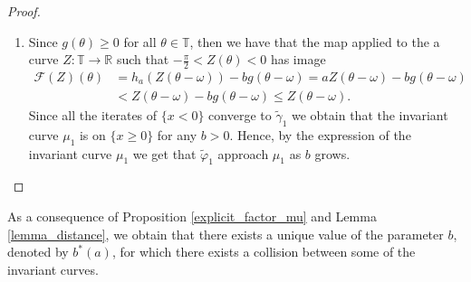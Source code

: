 \documentclass[12pt]{article}
\newcommand{\T}{\mathbb{T}}
\newcommand{\R}{\mathbb{R}}
\theoremstyle{plain}
\theoremstyle{remark}
\theoremstyle{definition}
\begin{document}
\begin{proof}
\begin{enumerate}
        \item Since $g(\theta)\geq0$ for all $\theta\in\T$, then we have that the map applied to the a curve $Z\colon\T\to\R$ such that $-\frac{\pi}{2}<Z(\theta)<0$ has image
            \begin{align*}
                \mathcal{F}(Z)(\theta) &= h_{a}(Z(\theta-\omega)) - b g(\theta-\omega) = a Z(\theta-\omega) - b g(\theta-\omega)\\
                &< Z(\theta-\omega) - b g(\theta-\omega) \leq Z(\theta-\omega).
            \end{align*}
        Since all the iterates of $\{x<0\}$ converge to $\tilde\gamma_1$ we obtain that the invariant curve $\mu_1$ is on $\{x\geq0\}$ for any $b>0$. Hence, by the expression of the invariant curve $\mu_1$ we get that $\tilde\varphi_1$ approach $\mu_1$ as $b$ grows.
    \end{enumerate}
\end{proof}

As a consequence of Proposition \eqref{explicit_factor_mu} and Lemma \eqref{lemma_distance}, we obtain that there exists a unique value of the parameter $b$, denoted by $b^*(a)$, for which there exists a collision between some of the invariant curves.
\end{document}
